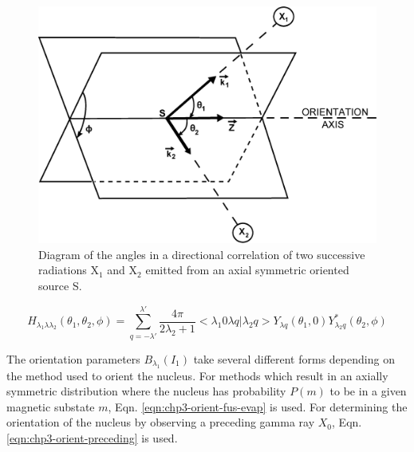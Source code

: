\begin{figure}[ht!]
	\centerline{\includegraphics[height=0.35\textheight]{./img/c3/dco_setup.eps}}
	\caption{Diagram of the angles in a directional correlation of two successive radiations X$_{1}$ and X$_{2}$ emitted from an axial symmetric oriented source S.\label{fig:chp3-DCO-Angles}}
\end{figure}

\begin{equation}
\label{eqn:chp3-angular-function}
H_{\lambda{}_1\lambda{}\lambda{}_2}\left(\theta{}_1,\theta{}_2,\phi{}\right) = \sum\limits_{q=-\lambda{}'}^{\lambda{}'}\frac{4 \pi{}}{2\lambda{}_2 +1} <\lambda{}_1 0 \lambda{} q | \lambda{}_2 q> Y_{\lambda{}q}\left(\theta{}_1,0\right) Y^{*}_{\lambda{}_2q}\left(\theta{}_2,\phi{}\right)
\end{equation}


The orientation parameters $B_{\lambda{}_1}\left(I_1\right)$ take several different forms depending on the method used to orient the nucleus. For methods which result in an axially symmetric distribution where the nucleus has probability $P(m)$ to be in a given magnetic substate $m$, Eqn. \ref{eqn:chp3-orient-fus-evap} is used. For determining the orientation of the nucleus by observing a preceding gamma ray $X_0$, Eqn. \ref{eqn:chp3-orient-preceding} is used.

